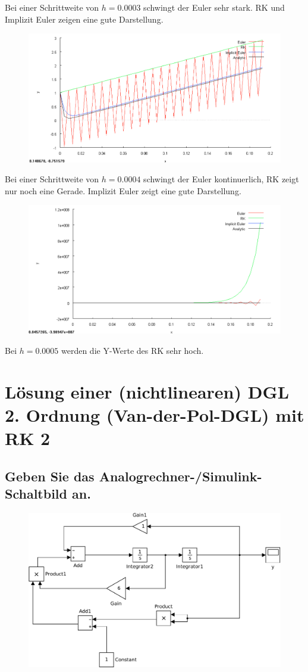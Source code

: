 \documentclass[10pt,a4paper]{article}
\begin{document}
Bei einer Schrittweite von $h = 0.0003$ schwingt der Euler sehr stark. RK und Implizit Euler zeigen eine gute Darstellung.
\begin{figure}[H]
\centering
\includegraphics[width=0.9\linewidth]{../screenshots/stiff0004.png}
\end{figure}
Bei einer Schrittweite von $h = 0.0004$ schwingt der Euler kontinuerlich, RK zeigt nur noch eine Gerade. Implizit Euler zeigt eine gute Darstellung.
\begin{figure}[H]
\centering
\includegraphics[width=0.9\linewidth]{../screenshots/stiff0005.png}
\end{figure}
Bei $h = 0.0005$ werden die Y-Werte des RK sehr hoch.

\section{Lösung einer (nichtlinearen) DGL 2. Ordnung (Van-der-Pol-DGL) mit RK 2}
\subsection{Geben Sie das Analogrechner-/Simulink-Schaltbild an.}
\begin{figure}[H]
\centering
\includegraphics[width=0.9\linewidth]{../screenshots/2}
\end{figure}
\end{document}
